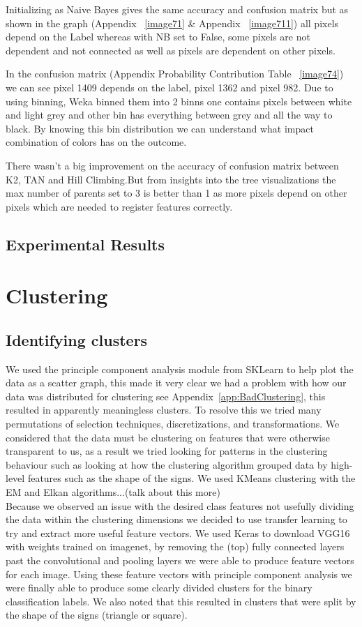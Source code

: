 \documentclass[11pt]{article}
\begin{document}
Initializing as Naive Bayes gives the same accuracy and confusion matrix but as shown in the graph (Appendix ~\ref{image71} \& Appendix ~\ref{image711}) all pixels depend on the Label whereas with NB set to False, some pixels are not dependent and not connected as well as pixels are dependent on other pixels.

In the confusion matrix (Appendix Probability Contribution Table ~\ref{image74}) we can see pixel 1409 depends on the label, pixel 1362 and pixel 982. Due to using binning, Weka binned them into 2 binns one contains pixels between white and light grey and other bin has everything between grey and all the way to black. By knowing this bin distribution we can understand what impact combination of colors has on the outcome.

There wasn't a big improvement on the accuracy of confusion matrix between K2, TAN and Hill Climbing.But from insights into the tree visualizations the max number of parents set to 3 is better than 1 as more pixels depend on other pixels which are needed to register features correctly.


\subsection{Experimental Results}

\pagebreak

\section{Clustering}
\subsection{Identifying clusters}
We used the principle component analysis module from SKLearn to help plot the data as a scatter graph, this made it very clear we had a problem with how our data was distributed for clustering see Appendix~\ref{app:BadClustering}, this resulted in apparently meaningless clusters.
To resolve this we tried many permutations of selection techniques, discretizations, and transformations. 
We considered that the data must be clustering on features that were otherwise transparent to us, as a result we tried looking for patterns in the clustering behaviour such as looking at how the clustering algorithm grouped data by high-level features such as the shape of the signs.
We used KMeans clustering with the EM and Elkan algorithms...({\huge talk about this more})\\
Because we observed an issue with the desired class features not usefully dividing the data within the clustering dimensions we decided to use transfer learning to try and extract more useful feature vectors.
We used Keras to download VGG16 with weights trained on imagenet, by removing the (top) fully connected layers past the convolutional and pooling layers we were able to produce feature vectors for each image. Using these feature vectors with principle component analysis we were finally able to produce some clearly divided clusters for the binary classification labels. 
We also noted that this resulted in clusters that were split by the shape of the signs (triangle or square).   
\end{document}

